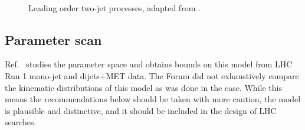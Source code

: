 \begin{figure}
\begin{feynmandiagram}[modelTDijetD]
  \end{feynmandiagram}\\\vspace{3\baselineskip}
  \begin{feynmandiagram}[modelTDijetE]
  \end{feynmandiagram}
\caption{Leading order two-jet \tchannel processes, adapted from \cite{Papucci:2014iwa}.}\label{fig:tchannelDijet}
\end{figure}

\subsection{Parameter scan}

Ref.~\cite{Papucci:2014iwa} studies the parameter space and obtains
bounds on this model from LHC Run 1 mono-jet and dijets+MET data. The Forum did not exhaustively compare the kinematic distributions of this model as was done in the \schannel case. While this means the recommendations below should be taken with more caution, the model is plausible and distinctive, and it should be included in the design of LHC searches.

